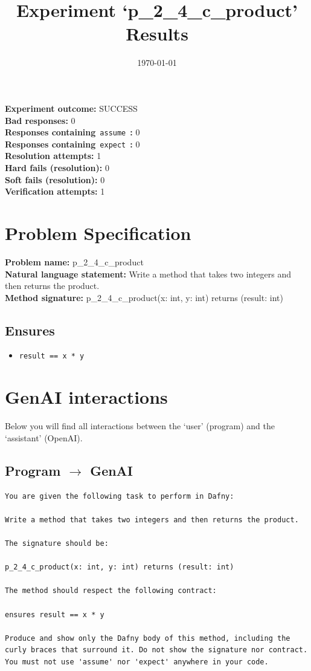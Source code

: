 \documentclass{article}
\begin{document}
\title{Experiment `p\_2\_4\_c\_product' Results}
\author{\today}
\date{}
\maketitle
\textbf{Experiment outcome: }SUCCESS
\\\textbf{Bad responses: }0
\\\textbf{Responses containing}~\texttt{assume}~\textbf{: }0
\\\textbf{Responses containing}~\texttt{expect}~\textbf{: }0
\\\textbf{Resolution attempts: }1
\\\textbf{Hard fails (resolution): }0
\\\textbf{Soft fails (resolution): }0
\\\textbf{Verification attempts: }1
\section*{Problem Specification}
\textbf{Problem name: }p\_2\_4\_c\_product
\\\textbf{Natural language statement: }Write a method that takes two integers and then returns the product.
\\\textbf{Method signature: }p\_2\_4\_c\_product(x: int, y: int) returns (result: int)
\subsection*{Ensures}
\begin{itemize}
\item \texttt{result == x * y}
\end{itemize}
\clearpage
\section*{GenAI interactions}
Below you will find all interactions between the `user' (program) and the `assistant' (OpenAI).
\subsection*{Program $\rightarrow$ GenAI}
\begin{lstlisting}
You are given the following task to perform in Dafny:

Write a method that takes two integers and then returns the product.

The signature should be:

p_2_4_c_product(x: int, y: int) returns (result: int)

The method should respect the following contract:

ensures result == x * y

Produce and show only the Dafny body of this method, including the curly braces that surround it. Do not show the signature nor contract. You must not use 'assume' nor 'expect' anywhere in your code.
\end{lstlisting}
\end{document}
